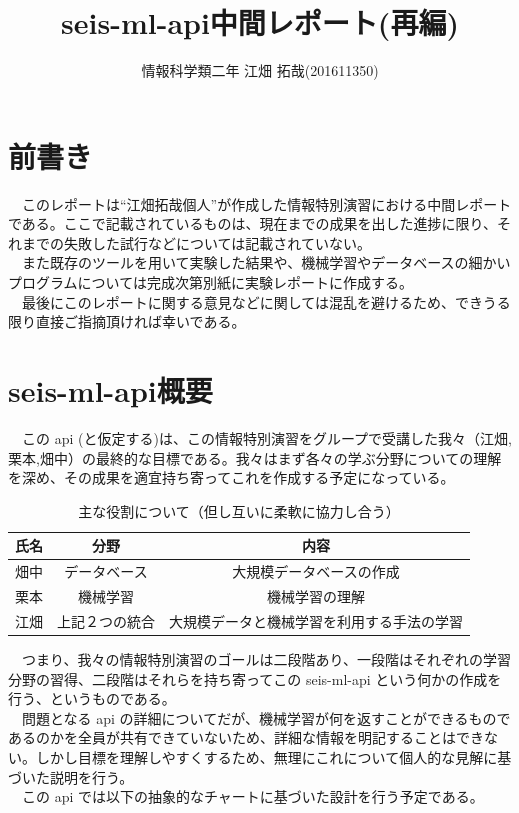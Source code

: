 \documentclass{scrartcl}
\author{情報科学類二年 江畑 拓哉(201611350)}
\date{}
\title{seis-ml-api中間レポート(再編)}
\begin{document}
\maketitle
\tableofcontents


\section{前書き}
\label{sec:org470ddd7}
　このレポートは``江畑拓哉個人''が作成した情報特別演習における中間レポートである。ここで記載されているものは、現在までの成果を出した進捗に限り、それまでの失敗した試行などについては記載されていない。\\
　また既存のツールを用いて実験した結果や、機械学習やデータベースの細かいプログラムについては完成次第別紙に実験レポートに作成する。\\
　最後にこのレポートに関する意見などに関しては混乱を避けるため、できうる限り直接ご指摘頂ければ幸いである。\\
\section{seis-ml-api概要}
\label{sec:orgd866fc1}
　この api (と仮定する)は、この情報特別演習をグループで受講した我々（江畑,栗本,畑中）の最終的な目標である。我々はまず各々の学ぶ分野についての理解を深め、その成果を適宜持ち寄ってこれを作成する予定になっている。\\

\begin{table}[htbp]
\caption{主な役割について（但し互いに柔軟に協力し合う）}
\centering
\begin{tabular}{|c|c|c|}
\hline
氏名 & 分野 & 内容\\
\hline
畑中 & データベース & 大規模データベースの作成\\
\hline
栗本 & 機械学習 & 機械学習の理解\\
\hline
江畑 & 上記２つの統合 & 大規模データと機械学習を利用する手法の学習\\
\hline
\end{tabular}
\end{table}

　つまり、我々の情報特別演習のゴールは二段階あり、一段階はそれぞれの学習分野の習得、二段階はそれらを持ち寄ってこの seis-ml-api という何かの作成を行う、というものである。\\
　問題となる api の詳細についてだが、機械学習が何を返すことができるものであるのかを全員が共有できていないため、詳細な情報を明記することはできない。しかし目標を理解しやすくするため、無理にこれについて個人的な見解に基づいた説明を行う。\\
　この api では以下の抽象的なチャートに基づいた設計を行う予定である。\\
\end{document}
